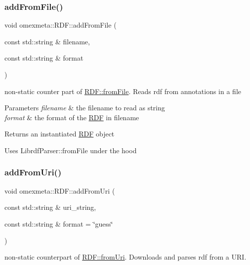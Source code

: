 \subsubsection{\texorpdfstring{add\+From\+File()}{addFromFile()}}
{\footnotesize\ttfamily void omexmeta\+::\+R\+D\+F\+::add\+From\+File (\begin{DoxyParamCaption}\item[{const std\+::string \&}]{filename,  }\item[{const std\+::string \&}]{format }\end{DoxyParamCaption})}



non-\/static counter part of \hyperlink{classomexmeta_1_1RDF_a98a1da84161a7935bf38ec5e5d34e91f}{R\+D\+F\+::from\+File}. Reads rdf from annotations in a file 


\begin{DoxyParams}{Parameters}
{\em filename} & the filename to read as string \\
\hline
{\em format} & the format of the \hyperlink{classomexmeta_1_1RDF}{R\+DF} in filename \\
\hline
\end{DoxyParams}
\begin{DoxyReturn}{Returns}
an instantiated \hyperlink{classomexmeta_1_1RDF}{R\+DF} object
\end{DoxyReturn}
Uses Librdf\+Parser\+::from\+File under the hood \mbox{\label{classomexmeta_1_1RDF_af99201be3782319d32e963ca7bed5b2b}} 
\subsubsection{\texorpdfstring{add\+From\+Uri()}{addFromUri()}}
{\footnotesize\ttfamily void omexmeta\+::\+R\+D\+F\+::add\+From\+Uri (\begin{DoxyParamCaption}\item[{const std\+::string \&}]{uri\+\_\+string,  }\item[{const std\+::string \&}]{format = {\ttfamily \char`\"{}guess\char`\"{}} }\end{DoxyParamCaption})}



non-\/static counterpart of \hyperlink{classomexmeta_1_1RDF_a03906aa5c3b9429a2afdbe0ad2be21e6}{R\+D\+F\+::from\+Uri}. Downloads and parses rdf from a U\+RI. 

